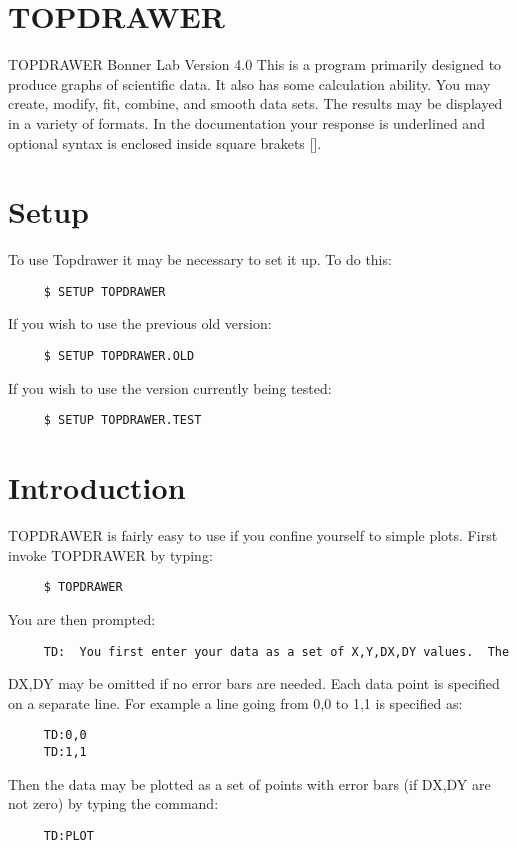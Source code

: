 
\section{TOPDRAWER}
TOPDRAWER
Bonner Lab Version 4.0
This is a program primarily designed to produce graphs of scientific data.
It also has some calculation ability.  You may create, modify, fit, combine,
and smooth data sets.  The results may be displayed in a variety of formats.
In the documentation your response is underlined and optional syntax is
enclosed inside square brakets [].  
\section{Setup}
To use Topdrawer it may be necessary to set it up.  To do this:  
\begin{verbatim}
     $ SETUP TOPDRAWER 
\end{verbatim}
If you wish to use the previous old version:  
\begin{verbatim}
     $ SETUP TOPDRAWER.OLD 
\end{verbatim}
If you wish to use the version currently being tested:  
\begin{verbatim}
     $ SETUP TOPDRAWER.TEST 
\end{verbatim}
\section{Introduction}
TOPDRAWER is fairly easy to use if you confine yourself to simple plots.
First invoke TOPDRAWER by typing:  
\begin{verbatim}
     $ TOPDRAWER 
\end{verbatim}
You are then prompted:  
\begin{verbatim}
     TD:  You first enter your data as a set of X,Y,DX,DY values.  The
\end{verbatim}
DX,DY may be omitted if no error bars are needed.  Each data point is
specified on a separate line.  For example a line going from 0,0 to 1,1 is
specified as:  
\begin{verbatim}
     TD:0,0 
     TD:1,1 
\end{verbatim}
Then the data may be plotted as a set of points with error bars (if DX,DY
are not zero) by typing the command:  
\begin{verbatim}
     TD:PLOT 
\end{verbatim}

